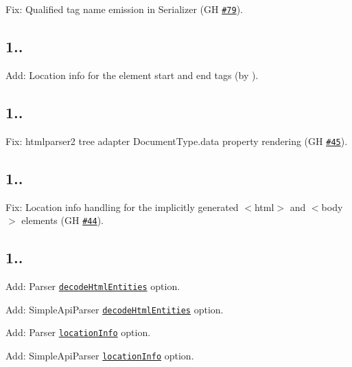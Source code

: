 
\begin{DoxyItemize}
\item Fix\+: Qualified tag name emission in Serializer (GH \href{https://github.com/inikulin/parse5/issues/79}{\tt \#79}).
\end{DoxyItemize}

\subsection*{1..}


\begin{DoxyItemize}
\item Add\+: Location info for the element start and end tags (by ).
\end{DoxyItemize}

\subsection*{1..}


\begin{DoxyItemize}
\item Fix\+: htmlparser2 tree adapter {\ttfamily Document\+Type.\+data} property rendering (GH \href{https://github.com/inikulin/parse5/issues/45}{\tt \#45}).
\end{DoxyItemize}

\subsection*{1..}


\begin{DoxyItemize}
\item Fix\+: Location info handling for the implicitly generated {\ttfamily $<$html$>$} and {\ttfamily $<$body$>$} elements (GH \href{https://github.com/inikulin/parse5/issues/44}{\tt \#44}).
\end{DoxyItemize}

\subsection*{1..}


\begin{DoxyItemize}
\item Add\+: Parser \href{https://github.com/inikulin/parse5#optionsdecodehtmlentities}{\tt decode\+Html\+Entities} option.
\item Add\+: Simple\+Api\+Parser \href{https://github.com/inikulin/parse5#optionsdecodehtmlentities-1}{\tt decode\+Html\+Entities} option.
\item Add\+: Parser \href{https://github.com/inikulin/parse5#optionslocationinfo}{\tt location\+Info} option.
\item Add\+: Simple\+Api\+Parser \href{https://github.com/inikulin/parse5#optionslocationinfo-1}{\tt location\+Info} option.
\end{DoxyItemize}

